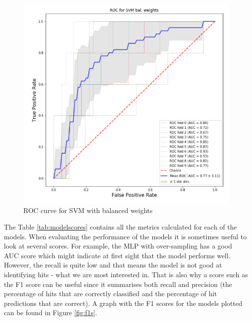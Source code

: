 \begin{figure}[h]
\centering
\includegraphics[width=0.7\linewidth]{results/fig/rocsvm.PNG}
\caption{ROC curve for SVM with balanced weights}
\label{fig:rocsvm}
\end{figure}

The Table \ref{tab:modelscores} contains all the metrics calculated for each of the models. When evaluating the performance of the models it is sometimes useful to look at several scores. For example, the MLP with over-sampling has a good AUC score which might indicate at first sight that the model performs well. However, the recall is quite low and that means the model is not good at identifying hits - what we are most interested in. That is also why a score such as the F1 score can be useful since it summarises both recall and precision (the percentage of hits that are correctly classified and the percentage of hit predictions that are correct). A graph with the F1 scores for the models plotted can be found in Figure \ref{fig:f1s}.

